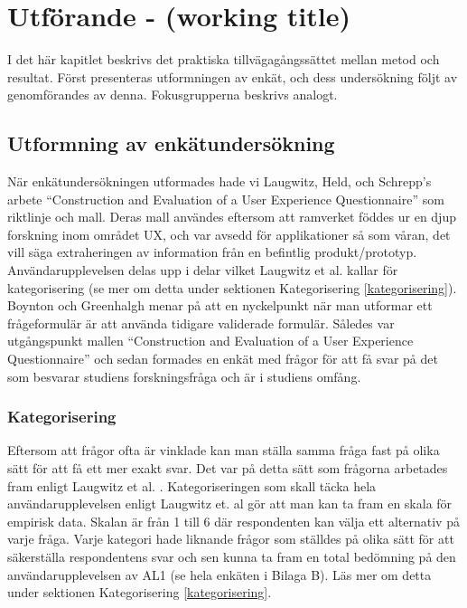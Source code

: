 \section{Utförande - (working title)}
I det här kapitlet beskrivs det praktiska tillvägagångssättet mellan metod och resultat. Först presenteras utformningen av enkät, och dess undersökning följt av genomförandes av denna.
Fokusgrupperna beskrivs analogt. 
\subsection{Utformning av enkätundersökning}
När enkätundersökningen utformades hade vi Laugwitz, Held, och Schrepp's arbete \enquote{Construction and Evaluation of a User Experience
Questionnaire} som riktlinje och mall\cite{Laugwitz2008ConstructionQuestionnaire}. Deras mall användes eftersom att ramverket föddes ur en djup forskning inom området UX, och var avsedd för applikationer så som våran, det vill säga extraheringen av information från en befintlig produkt/prototyp. Användarupplevelsen delas upp i delar vilket Laugwitz et al. kallar för kategorisering (se mer om detta under sektionen Kategorisering \ref{kategorisering})\cite{Laugwitz2008ConstructionQuestionnaire}.\\

Boynton och Greenhalgh menar på att en nyckelpunkt när man utformar ett frågeformulär är att använda tidigare validerade formulär\cite{Boynton2004SelectingQuestionnaire}. Således var utgångspunkt mallen \enquote{Construction and Evaluation of a User Experience
Questionnaire} och sedan formades en enkät med frågor för att få svar på det som besvarar studiens forskningsfråga och är i studiens omfång.  

\subsubsection{Kategorisering}
Eftersom att frågor ofta är vinklade kan man ställa samma fråga fast på olika sätt för att få ett mer exakt svar. Det var på detta sätt som frågorna arbetades fram enligt Laugwitz et al. \cite{Laugwitz2008ConstructionQuestionnaire}. Kategoriseringen som skall täcka hela användarupplevelsen enligt Laugwitz et. al \cite{Laugwitz2008ConstructionQuestionnaire} gör att man kan ta fram en skala för empirisk data. Skalan är från 1 till 6 där respondenten kan välja ett alternativ på varje fråga. Varje kategori hade liknande frågor som ställdes på olika sätt för att säkerställa respondentens svar och sen kunna ta fram en total bedömning på den användarupplevelsen av AL1 (se hela enkäten i Bilaga B). Läs mer om detta under sektionen Kategorisering \ref{kategorisering}.
\newline

